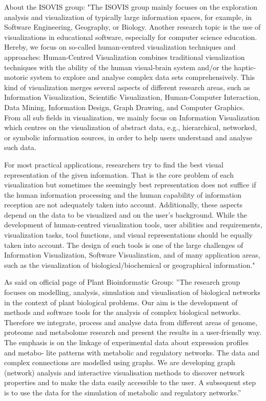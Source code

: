 \documentclass[a4paper,oneside]{article}
\begin{document}
About the ISOVIS group: "The ISOVIS group mainly focuses on the exploration analysis and visualization of typically large information spaces, for example, in Software Engineering, Geography, or Biology. Another research topic is the use of visualizations in educational software, especially for computer science education. Hereby, we focus on so-called human-centred visualization techniques and approaches:
Human-Centred Visualization combines traditional visualization techniques with the ability of the human visual-brain system and/or the haptic-motoric system to explore and analyse complex data sets comprehensively. This kind of visualization merges several aspects of different research areas, such as Information Visualization, Scientific Visualization, Human-Computer Interaction, Data Mining, Information Design, Graph Drawing, and Computer Graphics. From all sub fields in visualization, we mainly focus on Information Visualization which centres on the visualization of abstract data, e.g., hierarchical, networked, or symbolic information sources, in order to help users understand and analyse such data.


For most practical applications, researchers try to find the best visual representation of the given information. That is the core problem of each visualization but sometimes the seemingly best representation does not suffice if the human information processing and the human capability of information reception are not adequately taken into account. Additionally, these aspects depend on the data to be visualized and on the user's background. While the development of human-centred visualization tools, user abilities and requirements, visualization tasks, tool functions, and visual representations should be equally taken into account. The design of such tools is one of the large challenges of Information Visualization, Software Visualization, and of many application areas, such as the visualization of biological/biochemical or geographical information."~\cite{ISOVIS}


As said on official page of Plant Bioinformatic Group: ”The research group focuses on modelling, analysis, simulation and visualisation of biological networks in the context of plant biological problems. Our aim is the development of methods and software tools for the analysis of complex biological networks. Therefore we integrate, process and analyse data from different areas of genome, proteome and 
metabolome research and present the results in a user-friendly way. The emphasis is on the linkage of experimental data about expression profiles and metabo- 
lite patterns with metabolic and regulatory networks. The data and complex connections are modelled using graphs. We are developing graph (network) analysis and interactive visualisation methods to discover network properties and to make the data easily accessible to the user. A subsequent step is to use the data for the simulation of metabolic and regulatory networks.”~\cite{PBG}
\end{document}
